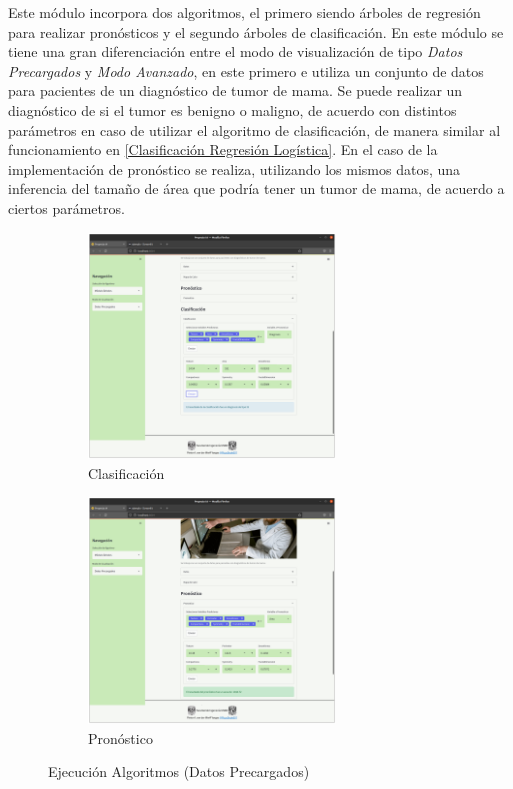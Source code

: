 \documentclass[10pt]{article}
\begin{document}
    Este módulo incorpora dos algoritmos, el primero siendo árboles de regresión para realizar pronósticos y el segundo árboles de clasificación. En este módulo se tiene una gran diferenciación entre el modo de visualización de tipo \textit{Datos Precargados} y \textit{Modo Avanzado}, en este primero e utiliza un conjunto de datos para pacientes de un diagnóstico de tumor de mama. Se puede realizar un diagnóstico de si el tumor es benigno o maligno, de acuerdo con distintos parámetros en caso de utilizar el algoritmo de clasificación, de manera similar al funcionamiento en \ref{Clasificación Regresión Logística}. En el caso de la implementación de pronóstico se realiza, utilizando los mismos datos, una inferencia del tamaño de área que podría tener un tumor de mama, de acuerdo a ciertos parámetros.
    
    \begin{figure}[H]
    
    \begin{subfigure}{0.5\textwidth}
    \centering
    \includegraphics[height=6cm]{img/ÁrbolesClasificaciónDP.png} 
    \caption{Clasificación}
    \label{fig:ArbolDPc}
    \end{subfigure}
    \begin{subfigure}{0.5\textwidth}
    \centering
    \includegraphics[height=6cm]{img/ÁrbolesPronósticoDP.png}
    \caption{Pronóstico}
    \label{fig:ArbolDPp}
    \end{subfigure}
    
    \caption{Ejecución Algoritmos (Datos Precargados)}
    \label{fig:ArbolesTDP}
    \end{figure}
    
\end{document}
